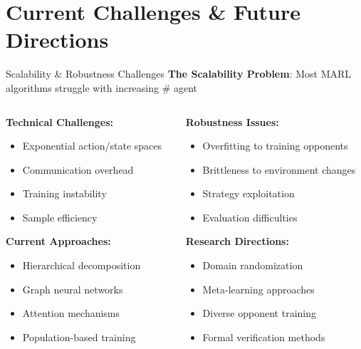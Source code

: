 \documentclass[aspectratio=169]{beamer}
\begin{document}
\section{Current Challenges \& Future Directions}

\begin{frame}{Scalability \& Robustness Challenges}
    \textbf{The Scalability Problem}:
    Most MARL algorithms struggle with increasing \# agent
    
    \vfill
    
    \begin{columns}
        \begin{column}{0.5\textwidth}
            \textbf{Technical Challenges:}
            \begin{itemize}
                \item Exponential action/state spaces
                \item Communication overhead  
                \item Training instability
                \item Sample efficiency \autocite{liu_scaling_2024}
            \end{itemize}
            
            \vfill
            \textbf{Current Approaches:}
            \begin{itemize}
                \item Hierarchical decomposition
                \item Graph neural networks
                \item Attention mechanisms
                \item Population-based training
            \end{itemize}
        \end{column}
        \begin{column}{0.5\textwidth}
            \textbf{Robustness Issues:}
            \begin{itemize}
                \item Overfitting to training opponents
                \item Brittleness to environment changes
                \item Strategy exploitation
                \item Evaluation difficulties
            \end{itemize}
            
            \vfill
            \textbf{Research Directions:}
            \begin{itemize}
                \item Domain randomization
                \item Meta-learning approaches
                \item Diverse opponent training
                \item Formal verification methods
            \end{itemize}
        \end{column}
    \end{columns}
\end{frame}
\end{document}
